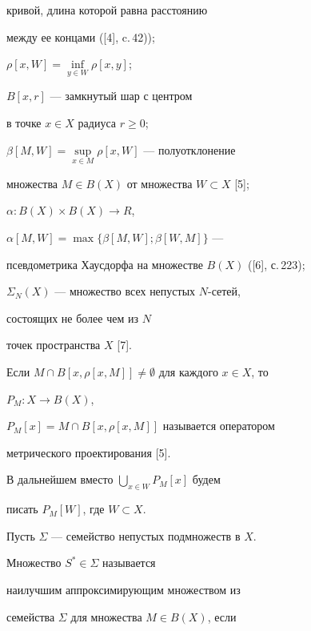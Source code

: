 кривой, длина которой равна расстоянию 


между ее концами ([4], c.\,42));





$\rho[x,W] = \inf\limits_{y \in W}{\rho [x,y]}$;





$B[x,r]$ --- замкнутый шар с центром 


в точке $x \in X$ радиуса $r \geq 0$;





$\beta [M,W] = \sup\limits_{x \in M}{\rho[x,W]}$ --- полуотклонение 


множества $M\in B(X)$ от множества $W \subset X$ [5];





$\alpha : B(X)\times B(X)\rightarrow R$,


$\alpha[M,W] = \max\{\beta [M,W];\beta [W,M]\}$ ---


псевдометрика Хаусдорфа на множестве $B(X)$ ([6], с.\,223);





$\Sigma_{N} (X)$ --- множество всех непустых $N$-сетей, 


состоящих не более чем из $N$ 


точек пространства $X$ [7]. 





Если $M \cap B[x, \rho [x,M]] \neq \emptyset $ для каждого $x \in X$, то 


$P_{M} : X \rightarrow B(X)$, 


$P_{M}[x] = M \cap B[x, \rho [x,M]]$ называется оператором 


метрического проектирования [5]. 


В дальнейшем вместо $\bigcup \limits_{x \in W}{P_{M}[x]}$ будем


писать $P_{M}[W]$, где $W \subset X$. 





Пусть $\Sigma$ --- семейство непустых подмножеств в $X$. 


Множество $S^{*} \in \Sigma $ называется


наилучшим аппроксимирующим множеством из 


семейства $\Sigma $ для множества $M \in B(X)$, если 


